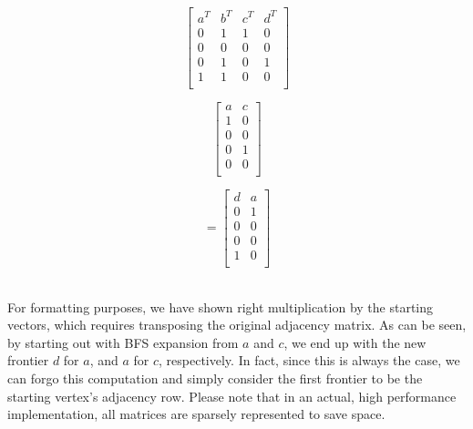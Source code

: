 %
\begin{minipage}{0.18\textwidth}
\begin{center}
\begin{displaymath}
\left[ \begin{array}{cccc}
  a^T & b^T & c^T & d^T \\
  0 & 1 & 1 & 0 \\
  0 & 0 & 0 & 0 \\
  0 & 1 & 0 & 1 \\
  1 & 1 & 0 & 0 \\
\end{array} \right]
\end{displaymath}
\end{center}
\end{minipage}
\hspace{5pt}
\begin{minipage}{0.12\textwidth}
\begin{center}
\begin{displaymath}
\left[ \begin{array}{cc}
   a & c \\
   1 & 0 \\ 
   0 & 0 \\ 
   0 & 1 \\ 
   0 & 0 \\
\end{array} \right]
\end{displaymath}
\end{center}
\end{minipage}
\begin{minipage}{0.12\textwidth}
\begin{center}
\begin{displaymath}
 = \left[ \begin{array}{cc}
  d & a\\
  0 & 1\\
  0 & 0\\ 
  0 & 0\\
  1 & 0\\
\end{array} \right]
\end{displaymath}
\end{center}
\end{minipage}
\\ %

%
For formatting purposes, we have shown right multiplication by the starting
vectors, which requires transposing the original adjacency matrix.
%
As can be seen, by starting out with BFS expansion from $a$ and $c$, we end 
up with the new frontier $d$ for $a$, and $a$ for $c$, respectively.
%
In fact, since this is always the case, we can forgo this computation and
simply consider the first frontier to be the starting vertex's adjacency row.
%
Please note that in an actual, high performance implementation, all matrices
are sparsely represented to save space.
